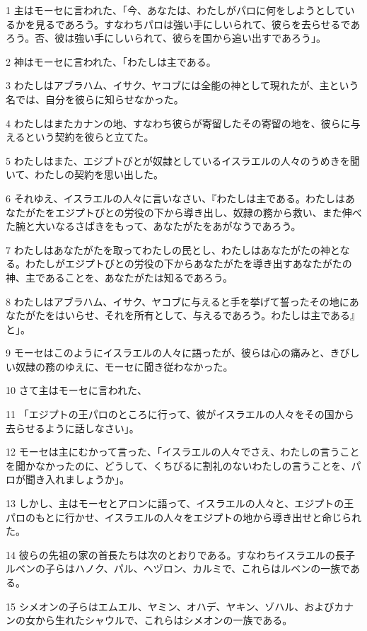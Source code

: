 \par 1 主はモーセに言われた、「今、あなたは、わたしがパロに何をしようとしているかを見るであろう。すなわちパロは強い手にしいられて、彼らを去らせるであろう。否、彼は強い手にしいられて、彼らを国から追い出すであろう」。
\par 2 神はモーセに言われた、「わたしは主である。
\par 3 わたしはアブラハム、イサク、ヤコブには全能の神として現れたが、主という名では、自分を彼らに知らせなかった。
\par 4 わたしはまたカナンの地、すなわち彼らが寄留したその寄留の地を、彼らに与えるという契約を彼らと立てた。
\par 5 わたしはまた、エジプトびとが奴隷としているイスラエルの人々のうめきを聞いて、わたしの契約を思い出した。
\par 6 それゆえ、イスラエルの人々に言いなさい、『わたしは主である。わたしはあなたがたをエジプトびとの労役の下から導き出し、奴隷の務から救い、また伸べた腕と大いなるさばきをもって、あなたがたをあがなうであろう。
\par 7 わたしはあなたがたを取ってわたしの民とし、わたしはあなたがたの神となる。わたしがエジプトびとの労役の下からあなたがたを導き出すあなたがたの神、主であることを、あなたがたは知るであろう。
\par 8 わたしはアブラハム、イサク、ヤコブに与えると手を挙げて誓ったその地にあなたがたをはいらせ、それを所有として、与えるであろう。わたしは主である』と」。
\par 9 モーセはこのようにイスラエルの人々に語ったが、彼らは心の痛みと、きびしい奴隷の務のゆえに、モーセに聞き従わなかった。
\par 10 さて主はモーセに言われた、
\par 11 「エジプトの王パロのところに行って、彼がイスラエルの人々をその国から去らせるように話しなさい」。
\par 12 モーセは主にむかって言った、「イスラエルの人々でさえ、わたしの言うことを聞かなかったのに、どうして、くちびるに割礼のないわたしの言うことを、パロが聞き入れましょうか」。
\par 13 しかし、主はモーセとアロンに語って、イスラエルの人々と、エジプトの王パロのもとに行かせ、イスラエルの人々をエジプトの地から導き出せと命じられた。
\par 14 彼らの先祖の家の首長たちは次のとおりである。すなわちイスラエルの長子ルベンの子らはハノク、パル、ヘヅロン、カルミで、これらはルベンの一族である。
\par 15 シメオンの子らはエムエル、ヤミン、オハデ、ヤキン、ゾハル、およびカナンの女から生れたシャウルで、これらはシメオンの一族である。

